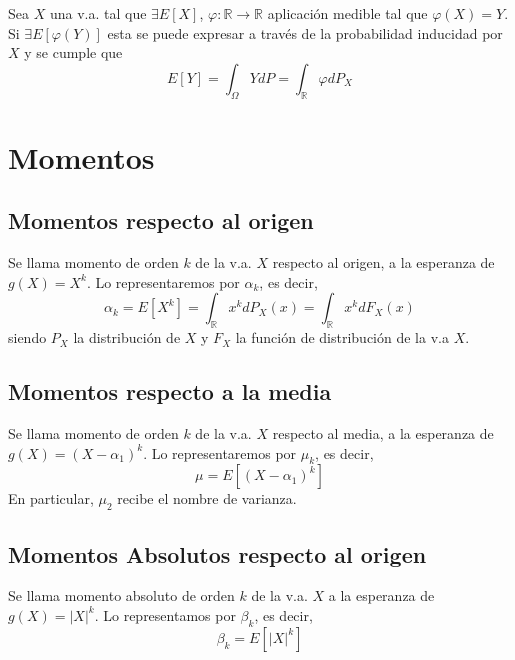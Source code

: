 \begin{theo}
  Sea $X$ una v.a. tal que $\exists E[X]$, $\varphi : \mathbb{R} \to \mathbb{R}$ aplicación medible tal que $\varphi(X) = Y$. Si $\exists E[\varphi(Y)]$ esta se puede expresar a través de la probabilidad inducidad por $X$ y se cumple que
  \[ 
    E[Y] = \int_{\Omega}^{} Y dP = \int_{\mathbb{R}}^{} \varphi dP_{X}
  \] 
\end{theo}

\section{Momentos}

\subsection{Momentos respecto al origen}

\begin{defn}
  Se llama momento de orden $k$ de la v.a. $X$ respecto al origen, a la esperanza de $g(X) = X^{k}$. Lo representaremos por $\alpha_{k}$, es decir,
  \[ 
    \alpha_{k} = E[X^{k}] = \int_{\mathbb{R}}^{} x^{k} dP_{X}(x) = \int_{\mathbb{R}}^{} x^{k} dF_{X}(x) 
  \] 
  siendo $P_{X}$ la distribución de $X$ y $F_{X}$ la función de distribución de la v.a $X$.
\end{defn}

\subsection{Momentos respecto a la media}

\begin{defn}
  Se llama momento de orden $k$ de la v.a. $X$ respecto al media, a la esperanza de $g(X) = (X -\alpha_{1})^{k}$. Lo representaremos por $\mu_{k}$, es decir,
  \[ 
    \mu = E[(X - \alpha_{1})^{k}]
  \] 
  En particular, $\mu_{2}$ recibe el nombre de varianza.
\end{defn}

\subsection{Momentos Absolutos respecto al origen}

\begin{defn}
  Se llama momento absoluto de orden $k$ de la v.a. $X$ a la esperanza de $g(X) = | X |^{k}$. Lo representamos por $\beta_{k}$, es decir,
  \[ 
    \beta_{k} = E[| X |^{k}] 
  \] 
\end{defn}

